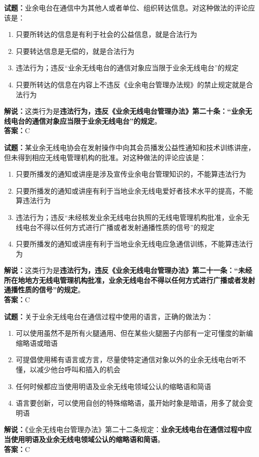 \documentclass{ctexbook}
\begin{document}
\vspace{\baselineskip}

\noindent\textbf{试题：}业余电台在通信中为其他人或者单位、组织转达信息。对这种做法的评论应该是：
\begin{enumerate}[leftmargin=3em]
  \item 只要所转达的信息是有利于社会的公益信息，就是合法行为
  \item 只要转达信息是无偿的，就是合法行为
  \item 违法行为；违反“业余无线电台的通信对象应当限于业余无线电台”的规定
  \item 只要所转达的信息在内容上不违反《业余电台管理办法规》的禁止规定就是合法行为
\end{enumerate}
\noindent\textbf{解说：}这类行为是\textbf{违法行为，违反《业余无线电台管理办法》第二十条：“业余无线电台的通信对象应当限于业余无线电台”的规定}。\\\noindent\textbf{答案：}C

\vspace{\baselineskip}

\noindent\textbf{试题：}某业余无线电协会在发射操作中向其会员播发公益性通知和技术训练讲座，但未得到相应无线电管理机构的批准。对这种做法的评论应该是：
\begin{enumerate}[leftmargin=3em]
  \item 只要所播发的通知或讲座是涉及宣传业余电台管理知识的，不能算违法行为
  \item 只要所播发的通知或讲座有利于当地业余无线电爱好者技术水平的提高，不能算违法行为
  \item 违法行为；违反“未经核发业余无线电台执照的无线电管理机构批准，业余无线电台不得以任何方式进行广播或者发射通播性质的信号”的规定
  \item 只要所播发的通知或讲座有利于当地业余无线电应急通信训练，不能算违法行为
\end{enumerate}
\noindent\textbf{解说：}这类行为是\textbf{违法行为，违反《业余无线电台管理办法》第二十一条：“未经所在地地方无线电管理机构批准，业余无线电台不得以任何方式进行广播或者发射通播性质的信号”的规定}。\\\noindent\textbf{答案：}C

\vspace{\baselineskip}

\noindent\textbf{试题：}关于业余无线电台在通信过程中使用的语言，正确的做法为：
\begin{enumerate}[leftmargin=3em]
  \item 可以使用虽然不是所有火腿通用、但在某些火腿圈子内部有一定可懂度的新编缩略语或暗语
  \item 可提倡使用稀有语言或方言，尽量使特定通信对象以外的业余无线电台听不懂，以减少他台呼叫和插入的机会
  \item 任何时候都应当使用明语及业余无线电领域公认的缩略语和简语
  \item 语言要创新，可以使用自创的特殊缩略语，虽开始时象是暗语，用多了就会变明语
\end{enumerate}
\noindent\textbf{解说：}《业余无线电台管理办法》第二十二条规定：\textbf{业余无线电台在通信过程中应当使用明语及业余无线电领域公认的缩略语和简语}。\\\noindent\textbf{答案：}C
\end{document}
